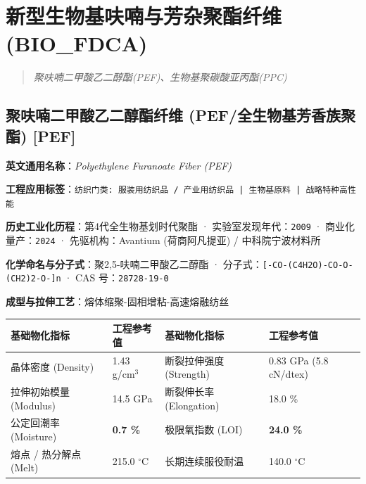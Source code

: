 \documentclass[11pt,openright,twoside,UTF8]{ctexbook}
\begin{document}
\chapter{新型生物基呋喃与芳杂聚酯纤维 (BIO\_FDCA)}
\begin{quote}
\small\itshape
聚呋喃二甲酸乙二醇酯(PEF)、生物基聚碳酸亚丙酯(PPC)
\end{quote}

\section{聚呋喃二甲酸乙二醇酯纤维 (PEF/全生物基芳香族聚酯) [PEF]}
\label{sec:pef}

\noindent\textbf{英文通用名称}：\textit{Polyethylene Furanoate Fiber (PEF)}\par
\noindent\textbf{工程应用标签}：\texttt{纺织门类: 服装用纺织品 / 产业用纺织品 | 生物基原料 | 战略特种高性能}\par
\noindent\textbf{历史工业化历程}：第4代全生物基划时代聚酯 · 实验室发现年代：\texttt{2009} · 商业化量产：\texttt{2024} · 先驱机构：Avantium (荷商阿凡提亚) / 中科院宁波材料所\par
\noindent\textbf{化学命名与分子式}：聚2,5-呋喃二甲酸乙二醇酯 · 分子式：\texttt{[-CO-(C4H2O)-CO-O-(CH2)2-O-]n} · CAS 号：\texttt{28728-19-0}\par
\noindent\textbf{成型与拉伸工艺}：熔体缩聚-固相增粘-高速熔融纺丝\par

\vspace{0.15cm}
\begin{center}
\small
\begin{tabularx}{\textwidth}{p{3.8cm}Xp{3.8cm}X}
\toprule
\textbf{基础物化指标} & \textbf{工程参考值} & \textbf{基础物化指标} & \textbf{工程参考值} \\
\midrule
晶体密度 (Density) & 1.43 g/cm$^3$ & 断裂拉伸强度 (Strength) & 0.83 GPa (5.8 cN/dtex) \\
拉伸初始模量 (Modulus) & 14.5 GPa & 断裂伸长率 (Elongation) & 18.0 \% \\
公定回潮率 (Moisture) & \textbf{0.7 \%} & 极限氧指数 (LOI) & \textbf{24.0 \%} \\
熔点 / 热分解点 (Melt) & 215.0 $^\circ\mathrm{C}$ & 长期连续服役耐温 & 140.0 $^\circ\mathrm{C}$ \\
\bottomrule
\end{tabularx}
\end{center}
\vspace{0.15cm}
\end{document}
